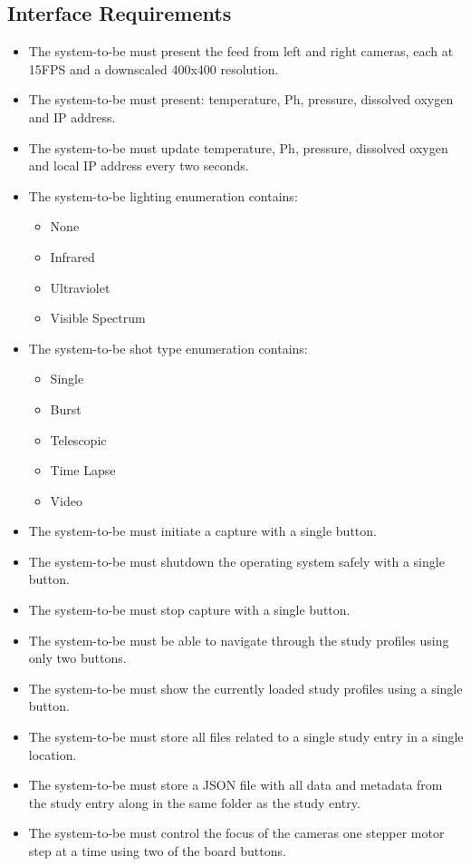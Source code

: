 \subsection{Interface Requirements}
\begin{itemize}
	\item The system-to-be must present the feed from left and right cameras, each at 15FPS and a downscaled 400x400 resolution.
	\item The system-to-be must present: temperature, Ph, pressure, dissolved oxygen and IP address.
	\item The system-to-be must update temperature, Ph, pressure, dissolved oxygen and local IP address every two seconds.
	\item The system-to-be lighting enumeration contains:
	      \begin{itemize}
		      \item None
		      \item Infrared
		      \item Ultraviolet
		      \item Visible Spectrum
	      \end{itemize}
	\item The system-to-be shot type enumeration contains:
	      \begin{itemize}
		      \item Single
		      \item Burst
		      \item Telescopic
		      \item Time Lapse
		      \item Video
	      \end{itemize}
	\item The system-to-be must initiate a capture with a single button.
	\item The system-to-be must shutdown the operating system safely with a single button.
	\item The system-to-be must stop capture with a single button.
	\item The system-to-be must be able to navigate through the study profiles using only two buttons.
	\item The system-to-be must show the currently loaded study profiles using a single button.
	\item The system-to-be must store all files related to a single study entry in a single location.
	\item The system-to-be must store a JSON file with all data and metadata from the study entry along in the same folder as the study entry.
	\item The system-to-be must control the focus of the cameras one stepper motor step at a time using two of the board buttons.
\end{itemize}